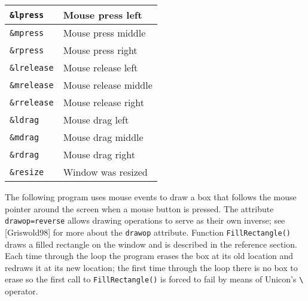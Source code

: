 \begin{center}
\begin{xtabular}{|m{0.9247598in}|m{2.3525598in}|}
\texttt{\&lpress} &
Mouse press left\\\hline
\texttt{\&mpress} &
Mouse press middle\\\hline
\texttt{\&rpress} &
Mouse press right\\\hline
\texttt{\&lrelease} &
Mouse release left\\\hline
\texttt{\&mrelease} &
Mouse release middle\\\hline
\texttt{\&rrelease} &
Mouse release right \\\hline
\texttt{\&ldrag} &
Mouse drag left \\\hline
\texttt{\&mdrag} &
Mouse drag middle \\\hline
\texttt{\&rdrag} &
Mouse drag right \\\hline
\texttt{\&resize} &
Window was resized \\\hline
\end{xtabular}
\end{center}
The following program uses mouse events to draw a box that follows the
mouse pointer around the screen when a mouse button is pressed. The
attribute \texttt{drawop=reverse} allows drawing operations to serve
as their own inverse; see [Griswold98] for more about the
\texttt{drawop} attribute. Function \texttt{FillRectangle()} draws a
filled rectangle on the window and is described in the reference
section. Each time through the loop the program erases the box at its
old location and redraws it at its new location; the first time
through the loop there is no box to erase so the first call to
\texttt{FillRectangle()} is forced to fail by means of Unicon's
\texttt{{\textbackslash}} operator.


